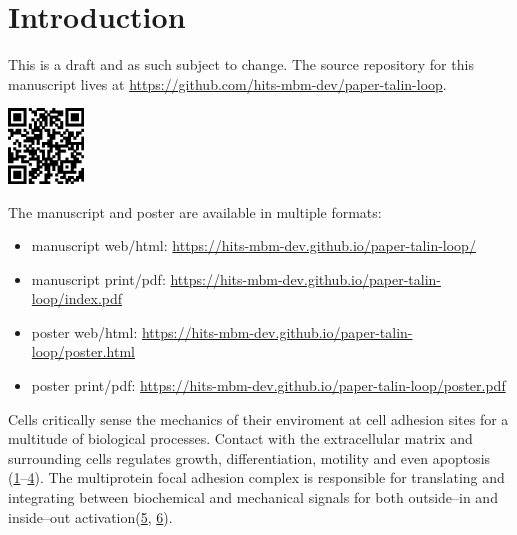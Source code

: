 \documentclass[
  twocolumn]{biophys-new-mod}
\providecommand{\tightlist}{%
  \setlength{\itemsep}{0pt}\setlength{\parskip}{0pt}}\usepackage{longtable,booktabs,array}
\begin{document}
\hypertarget{introduction}{%
\section{Introduction}\label{introduction}}

\begin{tcolorbox}[enhanced jigsaw, coltitle=black, left=2mm, leftrule=.75mm, toprule=.15mm, opacityback=0, bottomtitle=1mm, colback=white, breakable, rightrule=.15mm, opacitybacktitle=0.6, arc=.35mm, colbacktitle=quarto-callout-tip-color!10!white, bottomrule=.15mm, colframe=quarto-callout-tip-color-frame, toptitle=1mm, titlerule=0mm, title=\textcolor{quarto-callout-tip-color}{\faLightbulb}\hspace{0.5em}{Tip}]

This is a draft and as such subject to change. The source repository for
this manuscript lives at
\url{https://github.com/hits-mbm-dev/paper-talin-loop}.

\leavevmode{}%
\includegraphics[width=0.15\textwidth,height=\textheight]{./www/qrcode.png}

The manuscript and poster are available in multiple formats:

\begin{itemize}
\tightlist
\item
  manuscript web/html:
  \url{https://hits-mbm-dev.github.io/paper-talin-loop/}
\item
  manuscript print/pdf:
  \url{https://hits-mbm-dev.github.io/paper-talin-loop/index.pdf}
\item
  poster web/html:
  \url{https://hits-mbm-dev.github.io/paper-talin-loop/poster.html}
\item
  poster print/pdf:
  \url{https://hits-mbm-dev.github.io/paper-talin-loop/poster.pdf}
\end{itemize}

\end{tcolorbox}

Cells critically sense the mechanics of their enviroment at cell
adhesion sites for a multitude of biological processes. Contact with the
extracellular matrix and surrounding cells regulates growth,
differentiation, motility and even apoptosis
(\protect\hyperlink{ref-vogelLocalForceGeometry2006}{1}--\protect\hyperlink{ref-miroshnikovaAdhesionForcesCortical2018}{4}).
The multiprotein focal adhesion complex is responsible for translating
and integrating between biochemical and mechanical signals for both
outside--in and inside--out
activation(\protect\hyperlink{ref-thamilselvanPressureActivatesColon2004}{5},
\protect\hyperlink{ref-pelletierActivationStateIntegrin1995}{6}).
\end{document}
